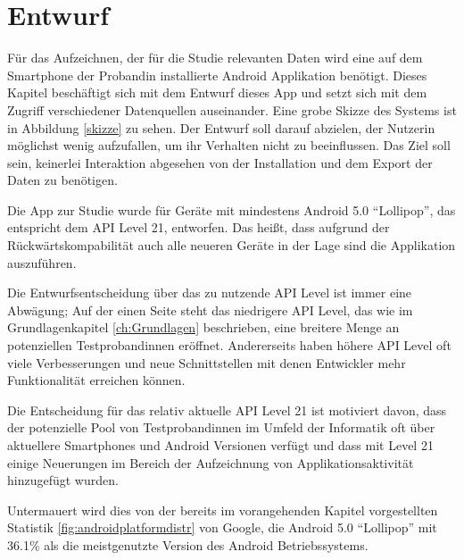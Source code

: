 
\chapter{Entwurf}
\label{ch:Entwurf}

Für das Aufzeichnen, der für die Studie relevanten Daten wird eine auf dem Smartphone der Probandin installierte Android Applikation benötigt. 
Dieses Kapitel beschäftigt sich mit dem Entwurf dieses App und setzt sich mit dem Zugriff verschiedener Datenquellen auseinander.
Eine grobe Skizze des Systems ist in Abbildung \ref{skizze} zu sehen.
Der Entwurf soll darauf abzielen, der Nutzerin möglichst wenig aufzufallen, um ihr Verhalten nicht zu beeinflussen.
Das Ziel soll sein, keinerlei Interaktion abgesehen von der Installation und dem Export der Daten zu benötigen. 
\par

Die App zur Studie wurde für Geräte mit mindestens Android 5.0 "`Lollipop"', das entspricht dem API Level 21, entworfen.
Das heißt, dass aufgrund der Rückwärtskompabilität auch alle neueren Geräte in der Lage sind die Applikation auszuführen.
\par


Die Entwurfsentscheidung über das zu nutzende API Level ist immer eine Abwägung;
Auf der einen Seite steht das niedrigere API Level, das wie im Grundlagenkapitel \ref{ch:Grundlagen} beschrieben, 
eine breitere Menge an potenziellen Testprobandinnen eröffnet.
Andererseits haben höhere API Level oft viele Verbesserungen und neue Schnittstellen mit denen Entwickler mehr Funktionalität erreichen können.
\par
Die Entscheidung für das relativ aktuelle API Level 21 ist motiviert davon, 
dass der potenzielle Pool von Testprobandinnen im Umfeld der Informatik oft über aktuellere Smartphones und Android Versionen verfügt
und dass mit Level 21 einige Neuerungen im Bereich der Aufzeichnung von Applikationsaktivität hinzugefügt wurden.

Untermauert wird dies von der bereits im vorangehenden Kapitel vorgestellten Statistik \ref{fig:androidplatformdistr}  von Google\cite{androiddistr}, 
die Android 5.0 "`Lollipop"' mit 36.1\% als die meistgenutzte Version des Android Betriebssystems.

